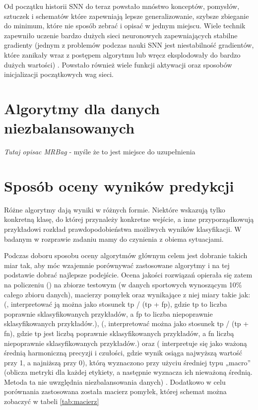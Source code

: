 Od początku historii SNN do teraz powstało mnóstwo konceptów, pomysłów, sztuczek i schematów które zapewniają lepsze generalizowanie, szybsze zbieganie do minimum, które nie sposób zebrać i opisać w jednym miejscu. Wiele technik zapewniło uczenie bardzo dużych sieci neuronowych zapewniających stabilne gradienty (jednym z problemów podczas nauki SNN jest niestabilność gradientów, które zanikały wraz z postępem algorytmu lub wręcz eksplodowały do bardzo dużych wartości) \cite{gradient}. Powstało również wiele funkcji aktywacji oraz sposobów inicjalizacji początkowych wag sieci.

\section{Algorytmy dla danych niezbalansowanych}

\textit{Tutaj opisac MRBag} - myśle że to jest miejsce do uzupełnienia

\section{Sposób oceny wyników predykcji}
\label{section:ocenaWynikow}

Różne algorytmy dają wyniki w różnych formie. Niektóre wskazują tylko  konkretną klasę, do której przynależy konkretne wejście, a inne przyporządkowują przykładowi rozkład prawdopodobieństwa możliwych wyników klasyfikacji. W badanym w rozprawie zadaniu mamy do czynienia z obiema sytuacjami. 

Podczas doboru sposobu oceny algorytmów głównym celem jest dobranie takich miar tak, aby móc wzajemnie porównywać zastosowane algorytmy i na tej podstawie dobrać najlepsze podejście. Ocena jakości rozwiązań opierała się zatem na policzeniu  () na zbiorze testowym (w danych sportowych wynoszącym 10\% całego zbioru danych), macierzy pomyłek oraz wynikające z niej miary takie jak:  (, interpretować ją można jako stosunek tp / (tp + fp), gdzie tp to liczba poprawnie sklasyfikowanych przykładów, a fp to liczba niepoprawnie sklasyfikowanych przykładów.),  (, interpretować można jako stosunek tp / (tp + fn), gdzie tp jest liczbą poprawnie sklasyfikowanych przykładów, a fn liczbą niepoprawnie sklasyfikowanych przykładów.) oraz  ( interpretuje się jako ważoną średnią harmoniczną precyzji i czułości, gdzie wynik  osiąga najwyższą wartość przy 1, a najniższą przy 0), którą wyznaczono przy użyciu średniej typu „macro” (oblicza metryki dla każdej etykiety, a następnie wyznacza ich nieważoną średnią. Metoda ta nie uwzględnia niezbalansowania danych) \cite{SKfscore}. Dodatkowo w celu porównania zastosowana została macierz pomyłek, której schemat można zobaczyć w tabeli \ref{tab:macierz}

